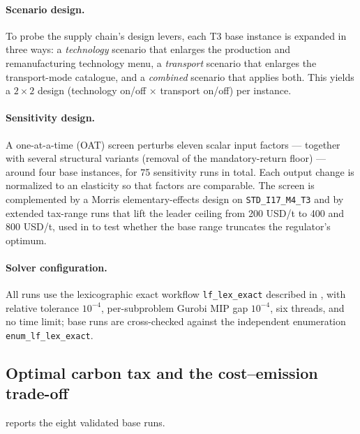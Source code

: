 \paragraph{Scenario design.}
To probe the supply chain's design levers, each T3 base instance is expanded in three
ways: a \emph{technology} scenario that enlarges the production and
remanufacturing technology menu, a \emph{transport} scenario that enlarges
the transport-mode catalogue, and a \emph{combined} scenario that applies
both. This yields a $2\times2$ design (technology on/off $\times$ transport
on/off) per instance.

\paragraph{Sensitivity design.}
A one-at-a-time (OAT) screen perturbs eleven scalar input factors --- together
with several structural variants (\eg removal of the mandatory-return floor)
--- around four base instances, for 75 sensitivity runs in total. Each output
change is normalized to an elasticity so that factors are comparable. The
screen is complemented by a Morris elementary-effects design
\citep{morris1991,saltelli2010} on \texttt{STD\_I17\_M4\_T3} and by extended
tax-range runs that lift the leader
ceiling from 200 USD/t to 400 and 800 USD/t, used in  to
test whether the base range truncates the regulator's optimum.

\paragraph{Solver configuration.}
All runs use the lexicographic exact workflow \texttt{lf\_lex\_exact}
described in , with relative \DBP tolerance
$10^{-4}$, per-subproblem Gurobi MIP gap $10^{-4}$, six threads, and no time
limit; base runs are cross-checked against the independent enumeration
\texttt{enum\_lf\_lex\_exact}.

\subsection{Optimal carbon tax and the cost--emission trade-off}
\label{sec:exp:tradeoff}

 reports the eight validated base runs.

\begin{table}[ht]
  \centering
  \caption{Validated lexicographic \DBP runs on the base instances.}
  \label{tab:results_main}
  
\end{table}


